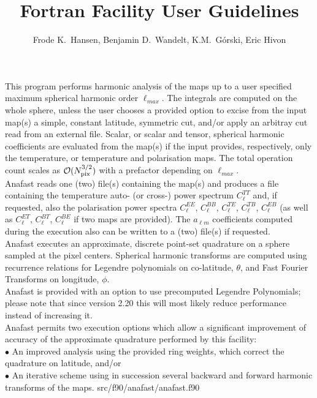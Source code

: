 
\sloppy


\title{\healpix Fortran Facility User Guidelines}
 \section[anafast]{\nosectionname}
\label{fac:anafast}
\author{Frode K.~Hansen, Benjamin D.~Wandelt, K.M.~G\'orski, Eric Hivon}

\begin{facility}
{This program performs harmonic analysis of the \healpix maps 
up to a user
specified maximum spherical harmonic order $\ell_{max}$.
The integrals are computed on the whole sphere, unless the user 
chooses  a provided option 
to excise from the input map(s) a simple, constant latitude, symmetric cut, and/or
apply an arbitray cut read from an external file.
Scalar, or scalar and tensor, spherical harmonic coefficients are evaluated
from the map(s) if the input provides, respectively, only the temperature,
or temperature and polarisation maps.
The total operation count scales as 
${\cal {O}}(N_{\rm pix}^{3/2} )$ with a prefactor
depending on $\ell_{max}$. %
\\ %
Anafast reads one (two) file(s) containing the map(s) and produces 
a file containing the temperature auto- (or cross-) power spectrum
$C^{TT}_\ell$ and, if requested, 
also the polarisation power spectra $C^{EE}_\ell$, $C^{BB}_\ell$, $C^{TE}_\ell$,
$C^{TB}_\ell$, $C^{EB}_\ell$ (as well as  $C^{ET}_\ell$,
$C^{BT}_\ell$, $C^{BE}_\ell$ if two maps are provided).
The $a_{\ell m}$  coefficients computed during the execution also can be  
written to a (two) file(s) if requested. %
\\ %
Anafast executes an approximate, discrete point-set quadrature on 
a sphere
sampled at the \healpix pixel centers.
Spherical harmonic transforms are computed 
using recurrence relations for Legendre polynomials on co-latitude, 
$\theta$, 
and  Fast Fourier Transforms on longitude, $\phi$. %
\\%
Anafast is provided with an option to use precomputed Legendre Polynomials;
please note that since version 2.20 this will most likely reduce performance
instead of increasing it. %
\\%
Anafast permits two execution options 
which allow a significant improvement of accuracy of 
the approximate quadrature performed by this facility:%
\\ %
$\bullet$ An improved analysis using the provided ring weights, 
which correct the quadrature
on latitude, and/or  %
\\%
$\bullet$ An iterative scheme using in 
succession several backward and forward harmonic transforms 
of the maps.}%
{src/f90/anafast/anafast.f90}
\end{facility}

